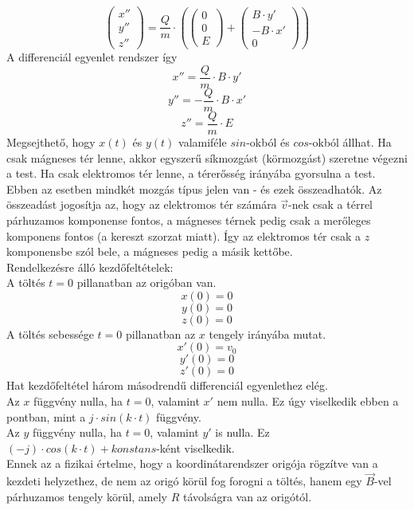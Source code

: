 \documentclass[11pt,a4paper,openany,leqno]{article}
\begin{document}
$$ \begin{pmatrix} x'' \\ y'' \\ z''  \end{pmatrix} = \frac{Q}{m} \cdot (\begin{pmatrix} 0 \\ 0 \\ E  \end{pmatrix} + \begin{pmatrix} B\cdot y' \\- B\cdot x' \\ 0  \end{pmatrix})  $$
\indent A differenciál egyenlet rendszer így
$$ x'' = \frac{Q}{m}\cdot B \cdot  y' $$
$$ y'' = -\frac{Q}{m}\cdot B \cdot  x' $$
$$ z'' = \frac{Q}{m}\cdot E $$ \indent
Megsejthető, hogy $x(t)$ és $y(t)$ valamiféle $sin$-okból és $cos$-okból állhat. Ha csak mágneses tér lenne, akkor egyszerű síkmozgást (körmozgást) szeretne végezni a test. Ha csak elektromos tér lenne, a térerősség irányába gyorsulna a test. Ebben az esetben mindkét mozgás típus jelen van - és ezek összeadhatók. Az összeadást jogosítja az, hogy az elektromos tér számára $\vec{v}$-nek csak a térrel párhuzamos komponense fontos, a mágneses térnek pedig csak a merőleges komponens fontos (a kereszt szorzat miatt). Így az elektromos tér csak a $z$ komponensbe szól bele, a mágneses pedig a másik kettőbe.\\ \indent
Rendelkezésre álló kezdőfeltételek:\\ \indent
A töltés $t=0$ pillanatban az origóban van.\\
$$ x(0) = 0 $$
$$ y(0) = 0 $$
$$ z(0) = 0 $$
\indent
A töltés sebessége $t=0$ pillanatban az $x$ tengely irányába mutat.\\
$$ x'(0) = v_0 $$
$$ y'(0) = 0 $$
$$ z'(0) = 0 $$
\indent
Hat kezdőfeltétel három másodrendű differenciál egyenlethez elég.\\ \indent
\medskip
Az $x$ függvény nulla, ha $t=0$, valamint $x'$ nem nulla. Ez úgy viselkedik ebben a pontban, mint a $j\cdot sin(k\cdot t)$ függvény.\\ \indent
Az $y$ függvény nulla, ha $t=0$, valamint $y'$ is nulla. Ez $(-j)\cdot cos(k\cdot t) + konstans$-ként viselkedik.\\ \indent
Ennek az a fizikai értelme, hogy a koordinátarendszer origója rögzítve van a kezdeti helyzethez, de nem az origó körül fog forogni a töltés, hanem egy $\vec{B}$-vel párhuzamos tengely körül, amely $R$ távolságra van az origótól.\\ \indent
\end{document}

